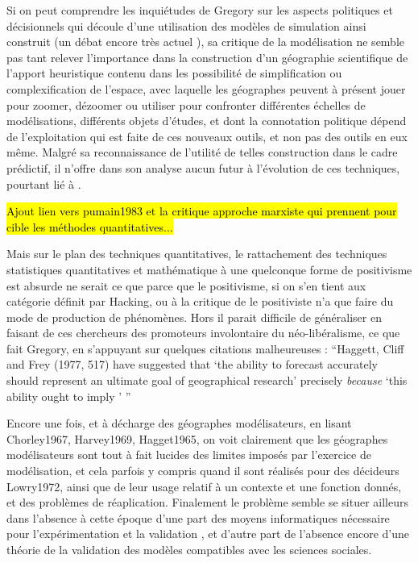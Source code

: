 Si on peut comprendre les inquiétudes de Gregory \textcite{Gregory1978} sur les aspects politiques et décisionnels qui découle d'une utilisation des modèles de simulation ainsi construit (un débat encore très actuel \autocite{OSullivan2004} ), sa critique de la modélisation ne semble pas tant relever l'importance dans la construction d'un géographie scientifique de l'apport heuristique contenu dans les possibilité de simplification ou complexification de l'espace, avec laquelle les géographes peuvent à présent jouer pour zoomer, dézoomer ou utiliser pour confronter différentes échelles de modélisations, différents objets d'études, et dont la connotation politique dépend de l'exploitation qui est faite de ces nouveaux outils, et non pas des outils en eux même. Malgré sa reconnaissance de l'utilité de telles construction dans le cadre prédictif, il n'offre dans son analyse aucun futur à l'évolution de ces techniques, pourtant lié à .

\hl{Ajout lien vers pumain1983 et la critique approche marxiste qui prennent pour cible les méthodes quantitatives...}

Mais sur le plan des techniques quantitatives, le rattachement des techniques statistiques quantitatives et mathématique à une quelconque forme de positivisme est absurde ne serait ce que parce que le positivisme, si on s'en tient aux catégorie définit par Hacking, ou à la critique de \autocite{Dauphine2003} le positiviste n'a que faire du mode de production de phénomènes. Hors il parait difficile de généraliser en faisant de ces chercheurs des promoteurs involontaire du néo-libéralisme, ce que fait Gregory, en s'appuyant sur quelques citations malheureuses : \foreignquote{english}{Haggett, Cliff and Frey (1977, 517) have suggested that \foreignquote{english}{the ability to forecast accurately should represent an ultimate goal of geographical research} precisely \textit{because} \foreignquote{english}{this ability ought to imply } } \autocite{Gregory1978} 

Encore une fois, et à décharge des géographes modélisateurs, en lisant Chorley1967, Harvey1969, Hagget1965, on voit clairement que les géographes modélisateurs sont tout à fait lucides des limites imposés par l'exercice de modélisation, et cela parfois y compris quand il sont réalisés pour des décideurs Lowry1972, ainsi que de leur usage relatif à un contexte et une fonction donnés, et des problèmes de réaplication. Finalement le problème semble se situer ailleurs dans l'absence à cette époque d'une part des moyens informatiques nécessaire pour l'expérimentation et la validation \autocite{Hagget1969, Marble1972}, et d'autre part de l'absence encore d'une théorie de la validation des modèles compatibles avec les sciences sociales.

